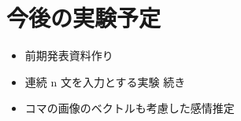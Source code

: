 \documentclass[twocolumn]{jarticle}     %
\begin{document}
\section{今後の実験予定}
\begin{itemize}
  \item 前期発表資料作り
  \item 連続 n 文を入力とする実験 続き
  \item コマの画像のベクトルも考慮した感情推定
\end{itemize}



\end{document}
